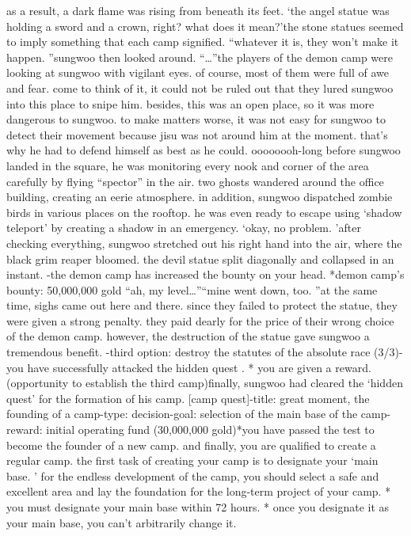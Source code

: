  as a result, a dark flame was rising from beneath its feet.
‘the angel statue was holding a sword and a crown, right? what does it mean?’the stone statues seemed to imply something that each camp signified.
“whatever it is, they won’t make it happen.
”sungwoo then looked around.
“…”the players of the demon camp were looking at sungwoo with vigilant eyes.
 of course, most of them were full of awe and fear.
come to think of it, it could not be ruled out that they lured sungwoo into this place to snipe him.
 besides, this was an open place, so it was more dangerous to sungwoo.
to make matters worse, it was not easy for sungwoo to detect their movement because jisu was not around him at the moment.
 that’s why he had to defend himself as best as he could.
oooooooh-long before sungwoo landed in the square, he was monitoring every nook and corner of the area carefully by flying “spector” in the air.
 two ghosts wandered around the office building, creating an eerie atmosphere.
in addition, sungwoo dispatched zombie birds in various places on the rooftop.
 he was even ready to escape using ‘shadow teleport’ by creating a shadow in an emergency.
‘okay, no problem.
’after checking everything, sungwoo stretched out his right hand into the air, where the black grim reaper bloomed.
the devil statue split diagonally and collapsed in an instant.
-the demon camp has increased the bounty on your head.
*demon camp’s bounty: 50,000,000 gold
“ah, my level…”“mine went down, too.
”at the same time, sighs came out here and there.
 since they failed to protect the statue, they were given a strong penalty.
 they paid dearly for the price of their wrong choice of the demon camp.
however, the destruction of the statue gave sungwoo a tremendous benefit.
-third option: destroy the statutes of the absolute race (3/3)-you have successfully attacked the hidden quest .
* you are given a reward.
 (opportunity to establish the third camp)finally, sungwoo had cleared the ‘hidden quest’ for the formation of his camp.
[camp quest]-title: great moment, the founding of a camp-type: decision-goal: selection of the main base of the camp-reward: initial operating fund (30,000,000 gold)*you have passed the test to become the founder of a new camp.
 and finally, you are qualified to create a regular camp.
 the first task of creating your camp is to designate your ‘main base.
’ for the endless development of the camp, you should select a safe and excellent area and lay the foundation for the long-term project of your camp.
* you must designate your main base within 72 hours.
* once you designate it as your main base, you can’t arbitrarily change it.

